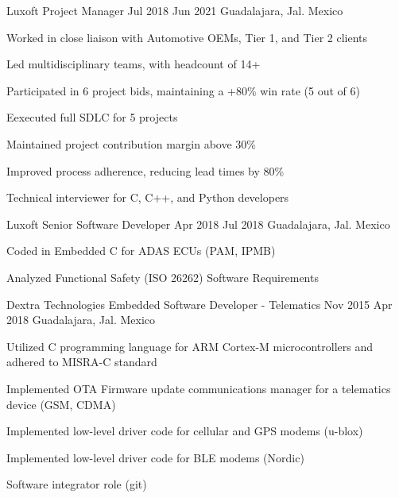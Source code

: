 \job
    {Luxoft}
    {Project Manager}
    {Jul 2018}
    {Jun 2021}
    {Guadalajara, Jal. Mexico}
    {
        \begin{itemize-bullets}
            \item{Worked in close liaison with Automotive OEMs, Tier 1, and Tier 2 clients}
            \item{Led multidisciplinary teams, with headcount of 14+}
            \item{Participated in 6 project bids, maintaining a +80\% win rate (5 out of 6)}
            \item{Eexecuted full SDLC for 5 projects}
            \item{Maintained project contribution margin above 30\% }
            \item{Improved process adherence, reducing lead times by 80\%}
            \item{Technical interviewer for C, C++, and Python developers}
        \end{itemize-bullets}
    }

\job
    {Luxoft}
    {Senior Software Developer}
    {Apr 2018}
    {Jul 2018}
    {Guadalajara, Jal. Mexico}
    {
        \begin{itemize-bullets}
            \item{Coded in Embedded C for ADAS ECUs (PAM, IPMB)}
            \item{Analyzed Functional Safety (ISO 26262) Software Requirements}
        \end{itemize-bullets}
    }

\job
    {Dextra Technologies}
    {Embedded Software Developer - Telematics}
    {Nov 2015}
    {Apr 2018}
    {Guadalajara, Jal. Mexico}
    {
        \begin{itemize-bullets}
            \item{Utilized C programming language for ARM Cortex-M microcontrollers and adhered to MISRA-C standard}
            \item{Implemented OTA Firmware update communications manager for a telematics device (GSM, CDMA)}
            \item{Implemented low-level driver code for cellular and GPS modems (u-blox)}
            \item{Implemented low-level driver code for BLE modems (Nordic)}
            \item{Software integrator role (git)}
        \end{itemize-bullets}
    }

